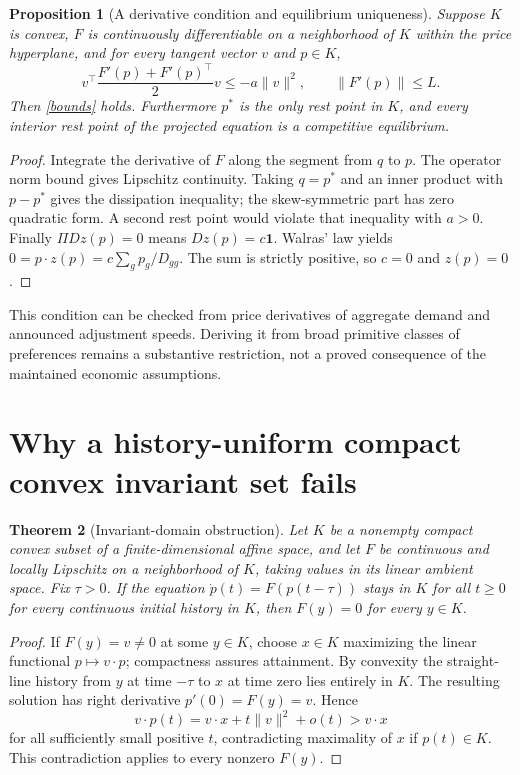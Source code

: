 \documentclass[11pt]{article}
\newtheorem{theorem}{Theorem}
\newtheorem{proposition}[theorem]{Proposition}
\theoremstyle{remark}
\begin{document}
\begin{proposition}[A derivative condition and equilibrium uniqueness]
Suppose $K$ is convex, $F$ is continuously differentiable on a
neighborhood of $K$ within the price hyperplane, and for every tangent
vector $v$ and $p\in K$,
\[
 v^\top\frac{F'(p)+F'(p)^\top}{2}v\leq-a\|v\|^2,
 \qquad\|F'(p)\|\leq L.
\]
Then \eqref{bounds} holds. Furthermore $p^*$ is the only rest point
in $K$, and every interior rest point of the projected equation is a
competitive equilibrium.
\end{proposition}
\begin{proof}
Integrate the derivative of $F$ along the segment from $q$ to $p$.
The operator norm bound gives Lipschitz continuity. Taking $q=p^*$
and an inner product with $p-p^*$ gives the dissipation inequality;
the skew-symmetric part has zero quadratic form. A second rest point
would violate that inequality with $a>0$. Finally $\Pi Dz(p)=0$ means
$Dz(p)=c\mathbf1$. Walras' law yields
$0=p\cdot z(p)=c\sum_g p_g/D_{gg}$. The sum is strictly positive,
so $c=0$ and $z(p)=0$.
\end{proof}

This condition can be checked from price derivatives of aggregate demand
and announced adjustment speeds. Deriving it from broad primitive
classes of preferences remains a substantive restriction, not a proved
consequence of the maintained economic assumptions.

\section{Why a history-uniform compact convex invariant set fails}
\begin{theorem}[Invariant-domain obstruction]\label{obstruction}
Let $K$ be a nonempty compact convex subset of a finite-dimensional
affine space, and let $F$ be continuous and locally Lipschitz on a
neighborhood of $K$, taking values in its linear ambient space. Fix
$\tau>0$. If the equation $\dot p(t)=F(p(t-\tau))$ stays in $K$ for
all $t\geq0$ for every continuous initial history in $K$, then
$F(y)=0$ for every $y\in K$.
\end{theorem}
\begin{proof}
If $F(y)=v\ne0$ at some $y\in K$, choose $x\in K$ maximizing the
linear functional $p\mapsto v\cdot p$; compactness assures attainment.
By convexity the straight-line history from $y$ at time $-\tau$ to
$x$ at time zero lies entirely in $K$. The resulting solution has
right derivative $p'(0)=F(y)=v$. Hence
\[
 v\cdot p(t)=v\cdot x+t\|v\|^2+o(t)>v\cdot x
\]
for all sufficiently small positive $t$, contradicting maximality of
$x$ if $p(t)\in K$. This contradiction applies to every nonzero $F(y)$.
\end{proof}
\end{document}
